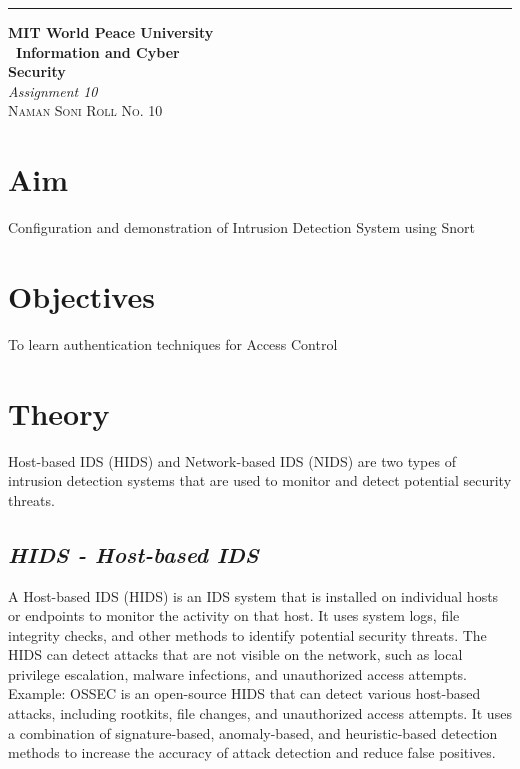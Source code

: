 \documentclass{article}
\begin{document}
	\begin{titlepage} %
	
	\raggedleft\rule{1pt}{\textheight} %
	\hspace{0.05\textwidth} %
	\parbox[b]{0.75\textwidth}
	{ %
		
		{\Huge\bfseries MIT World Peace University \\[0.5\baselineskip] \ Information and Cyber \\ Security}\\[2\baselineskip] %
		{\large\textit{Assignment 10}}\\[4\baselineskip] %
		{\Large\textsc{Naman Soni Roll No. 10}} %
		
		\vspace{0.5\textheight} %
	}
	
\end{titlepage}
\tableofcontents
\pagebreak
\section{\textbf{Aim}}
Configuration and demonstration of Intrusion Detection System using Snort
\section{\textbf{Objectives}}
To learn authentication techniques for Access Control

\section{\textbf{Theory}}
Host-based IDS (HIDS) and Network-based IDS (NIDS) are two types of intrusion detection systems that are used to monitor and detect potential security threats.
\subsection{\textit{HIDS \textit{}- Host-based IDS}}
A Host-based IDS (HIDS) is an IDS system that is installed on individual hosts or endpoints to monitor the activity on that host. It uses system logs, file integrity checks, and other methods to identify potential security threats. The HIDS can detect attacks that are not visible on the network, such as local privilege escalation, malware infections, and unauthorized access attempts.
Example: OSSEC is an open-source HIDS that can detect various host-based attacks, including rootkits, file changes, and unauthorized access attempts. It uses a combination of signature-based, anomaly-based, and heuristic-based detection methods to increase the accuracy of attack detection and reduce false positives.
\end{document}
